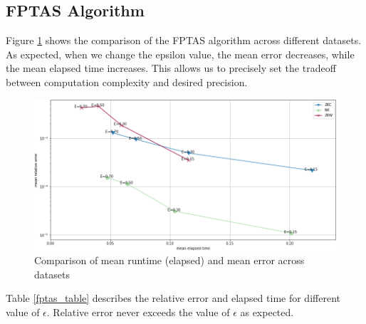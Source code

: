 \documentclass[a4paper,10pt]{article}
\begin{document}
\subsection{FPTAS Algorithm}


Figure \ref{fptas_comparison} shows the comparison of the FPTAS algorithm across different datasets. As expected, when we change the epsilon value, the mean error decreases, while the mean elapsed time increases. This allows us to precisely set the tradeoff between computation complexity and desired precision.

\begin{figure}[!htb]
	\centering
  	\includegraphics[width=\textwidth]{images/fptas_comparison.png}
	\caption{Comparison of mean runtime (elapsed) and mean error across datasets}
	\label{fptas_comparison}
\end{figure}

Table \ref{fptas_table} describes the relative error and elapsed time for different value of $\epsilon$. Relative error never exceeds the value of $\epsilon$ as expected. 
\end{document}
